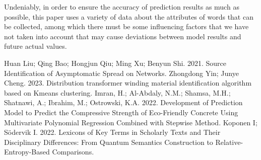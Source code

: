 \documentclass{mcmthesis}
\begin{document}
Undeniably, in order to ensure the accuracy of prediction results as much as possible, this paper uses a variety of data about the attributes of words that can be collected, among which there must be some influencing factors that we have not taken into account that may cause deviations between model results and future actual values.

\begin{thebibliography}{99}
 Huan Liu; Qing Bao; Hongjun Qiu; Ming Xu; Benyun Shi. 2021. Source Identification of Asymptomatic Spread on Networks.
Zhongdong Yin; Junye Cheng. 2023. Distribution transformer winding material identification algorithm based on Kmeans clustering.
Imran, H.; Al-Abdaly, N.M.; Shamsa, M.H.; Shatnawi, A.; Ibrahim, M.; Ostrowski, K.A. 2022. Development of Prediction Model to Predict the Compressive Strength of Eco-Friendly Concrete Using Multivariate Polynomial Regression Combined with Stepwise Method.
Koponen I; Södervik I. 2022. Lexicons of Key Terms in Scholarly Texts and Their Disciplinary Differences: From Quantum Semantics Construction to Relative-Entropy-Based Comparisons.

\end{thebibliography}
\end{document}
